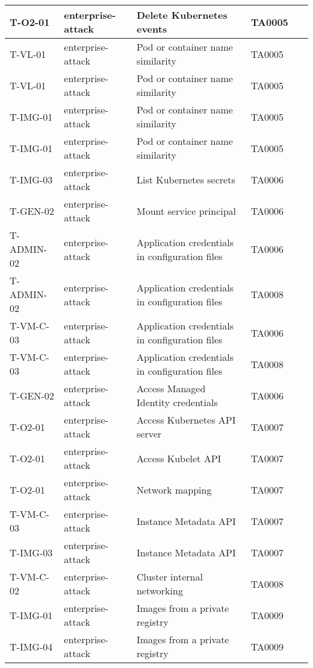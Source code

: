 \begin{table}[!ht]
\begin{tabular}{|l|l|l|l|l|}
        T-O2-01 & enterprise-attack & Delete Kubernetes events & TA0005 & ~ \\ \hline
        T-VL-01 & enterprise-attack & Pod or container name similarity & TA0005 & ~ \\ \hline
        T-VL-01 & enterprise-attack & Pod or container name similarity & TA0005 & ~ \\ \hline
        T-IMG-01 & enterprise-attack & Pod or container name similarity & TA0005 & ~ \\ \hline
        T-IMG-01 & enterprise-attack & Pod or container name similarity & TA0005 & ~ \\ \hline
        T-IMG-03 & enterprise-attack & List Kubernetes secrets & TA0006 & ~ \\ \hline
        T-GEN-02 & enterprise-attack & Mount service principal & TA0006 & ~ \\ \hline
        T-ADMIN-02 & enterprise-attack & Application credentials in configuration files & TA0006 & ~ \\ \hline
        T-ADMIN-02 & enterprise-attack & Application credentials in configuration files & TA0008 & ~ \\ \hline
        T-VM-C-03 & enterprise-attack & Application credentials in configuration files & TA0006 & ~ \\ \hline
        T-VM-C-03 & enterprise-attack & Application credentials in configuration files & TA0008 & ~ \\ \hline
        T-GEN-02 & enterprise-attack & Access Managed Identity credentials & TA0006 & ~ \\ \hline
        T-O2-01 & enterprise-attack & Access Kubernetes API server & TA0007 & ~ \\ \hline
        T-O2-01 & enterprise-attack & Access Kubelet API & TA0007 & ~ \\ \hline
        T-O2-01 & enterprise-attack & Network mapping & TA0007 & ~ \\ \hline
        T-VM-C-03 & enterprise-attack & Instance Metadata API & TA0007 & ~ \\ \hline
        T-IMG-03 & enterprise-attack & Instance Metadata API & TA0007 & ~ \\ \hline
        T-VM-C-02 & enterprise-attack & Cluster internal networking & TA0008 & ~ \\ \hline
        T-IMG-01 & enterprise-attack & Images from a private registry & TA0009 & ~ \\ \hline
        T-IMG-04 & enterprise-attack & Images from a private registry & TA0009 & ~ \\ \hline

\end{tabular}
\end{table}
